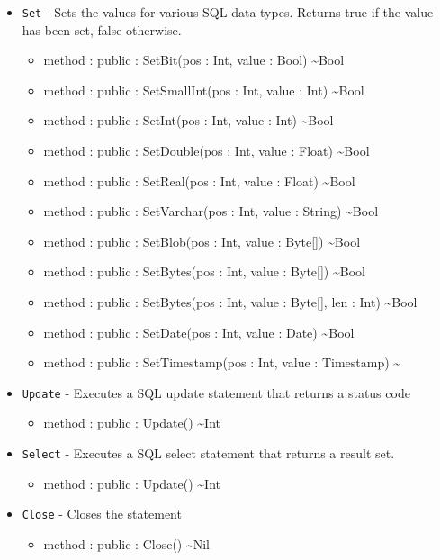 \documentclass[11pt]{article}
\begin{document}
\begin{itemize}
\item \texttt{Set} - Sets the values for various SQL data types.
  Returns true if the value has been set, false otherwise.
  \begin{itemize}
  \item method : public : SetBit(pos : Int, value : Bool) \textasciitilde Bool
  \item method : public : SetSmallInt(pos : Int, value : Int) \textasciitilde Bool
  \item method : public : SetInt(pos : Int, value : Int) \textasciitilde Bool
  \item method : public : SetDouble(pos : Int, value : Float) \textasciitilde Bool
  \item method : public : SetReal(pos : Int, value : Float) \textasciitilde Bool
  \item method : public : SetVarchar(pos : Int, value : String) \textasciitilde Bool
  \item method : public : SetBlob(pos : Int, value : Byte[]) \textasciitilde Bool
  \item method : public : SetBytes(pos : Int, value : Byte[]) \textasciitilde Bool
  \item method : public : SetBytes(pos : Int, value : Byte[], len : Int) \textasciitilde Bool
  \item method : public : SetDate(pos : Int, value : Date) \textasciitilde Bool
  \item method : public : SetTimestamp(pos : Int, value : Timestamp) \textasciitilde
  \end{itemize}
\item \texttt{Update} - Executes a SQL update statement that returns
  a status code
  \begin{itemize}
  \item method : public : Update() \textasciitilde Int
  \end{itemize}
\item \texttt{Select} - Executes a SQL select statement that returns a
  result set.
  \begin{itemize}
  \item method : public : Update() \textasciitilde Int
  \end{itemize}
\item \texttt{Close} - Closes the statement
  \begin{itemize}
  \item method : public : Close() \textasciitilde Nil
  \end{itemize}
\end{itemize}
\end{document}
